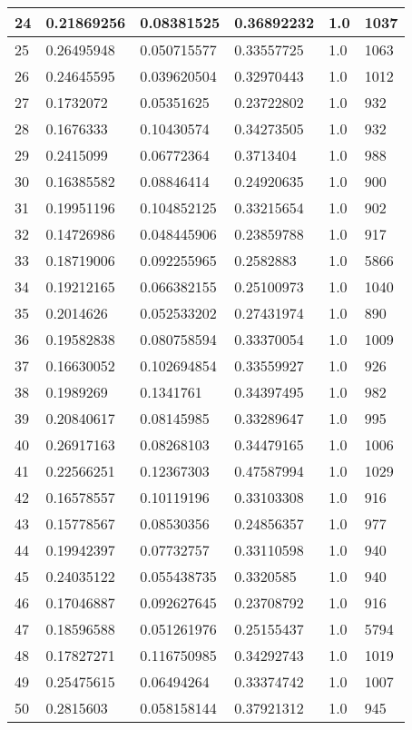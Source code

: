 \begin{longtable}{|l|l|l|l|l|l|}
24 & 0.21869256 & 0.08381525 & 0.36892232 & 1.0 & 1037 \\ \hline 
25 & 0.26495948 & 0.050715577 & 0.33557725 & 1.0 & 1063 \\ \hline 
26 & 0.24645595 & 0.039620504 & 0.32970443 & 1.0 & 1012 \\ \hline 
27 & 0.1732072 & 0.05351625 & 0.23722802 & 1.0 & 932 \\ \hline 
28 & 0.1676333 & 0.10430574 & 0.34273505 & 1.0 & 932 \\ \hline 
29 & 0.2415099 & 0.06772364 & 0.3713404 & 1.0 & 988 \\ \hline 
30 & 0.16385582 & 0.08846414 & 0.24920635 & 1.0 & 900 \\ \hline 
31 & 0.19951196 & 0.104852125 & 0.33215654 & 1.0 & 902 \\ \hline 
32 & 0.14726986 & 0.048445906 & 0.23859788 & 1.0 & 917 \\ \hline 
33 & 0.18719006 & 0.092255965 & 0.2582883 & 1.0 & 5866 \\ \hline 
34 & 0.19212165 & 0.066382155 & 0.25100973 & 1.0 & 1040 \\ \hline 
35 & 0.2014626 & 0.052533202 & 0.27431974 & 1.0 & 890 \\ \hline 
36 & 0.19582838 & 0.080758594 & 0.33370054 & 1.0 & 1009 \\ \hline 
37 & 0.16630052 & 0.102694854 & 0.33559927 & 1.0 & 926 \\ \hline 
38 & 0.1989269 & 0.1341761 & 0.34397495 & 1.0 & 982 \\ \hline 
39 & 0.20840617 & 0.08145985 & 0.33289647 & 1.0 & 995 \\ \hline 
40 & 0.26917163 & 0.08268103 & 0.34479165 & 1.0 & 1006 \\ \hline 
41 & 0.22566251 & 0.12367303 & 0.47587994 & 1.0 & 1029 \\ \hline 
42 & 0.16578557 & 0.10119196 & 0.33103308 & 1.0 & 916 \\ \hline 
43 & 0.15778567 & 0.08530356 & 0.24856357 & 1.0 & 977 \\ \hline 
44 & 0.19942397 & 0.07732757 & 0.33110598 & 1.0 & 940 \\ \hline 
45 & 0.24035122 & 0.055438735 & 0.3320585 & 1.0 & 940 \\ \hline 
46 & 0.17046887 & 0.092627645 & 0.23708792 & 1.0 & 916 \\ \hline 
47 & 0.18596588 & 0.051261976 & 0.25155437 & 1.0 & 5794 \\ \hline 
48 & 0.17827271 & 0.116750985 & 0.34292743 & 1.0 & 1019 \\ \hline 
49 & 0.25475615 & 0.06494264 & 0.33374742 & 1.0 & 1007 \\ \hline 
50 & 0.2815603 & 0.058158144 & 0.37921312 & 1.0 & 945 \\ \hline 
\end{longtable}